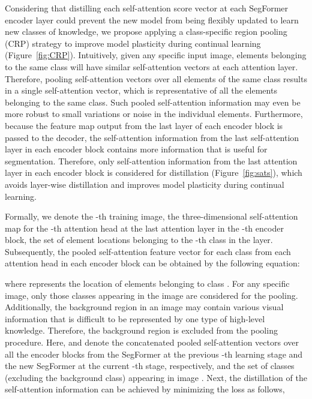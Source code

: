 \documentclass[onecolumn,conference,compsoc]{IEEEtran}
\begin{document}
\begin{spacing}{1.5}
Considering that {distilling} each self-attention score vector at each SegFormer encoder layer  {could prevent} the new model  {from} being flexibly updated to learn new classes of knowledge, we propose applying a class-specific region pooling (CRP) strategy to improve model plasticity during continual learning (Figure~\ref{fig:CRP}). Intuitively, given any specific input image, elements belonging to the same class will have similar self-attention vectors {at each attention layer}. Therefore, pooling self-attention vectors over all elements of the same class results in a single self-attention vector, which is representative  {of} all the elements belonging to the same class. Such pooled self-attention information may even be more robust to small variations or noise in the individual elements.  {Furthermore, because} the feature map output from the last layer of each encoder block is passed to the decoder, the self-attention information from the last self-attention layer in each encoder block contains more information that is useful for segmentation.  {Therefore,} only self-attention information from the last attention layer in each encoder block is considered for distillation (Figure~\ref{fig:sats}), which avoids layer-wise distillation and improves model plasticity during continual learning.

Formally,  we denote  the -th training image,  the three-dimensional self-attention map for the -th attention head at the last attention layer in the -th encoder block,  the set of element locations belonging to the -th class in the layer.  {Subsequently,} the pooled self-attention feature vector for each class from each attention head in each encoder block can be obtained by  {the following equation:}



\noindent where  represents the location of elements belonging to class . For any specific image, only those classes appearing in the image are considered for the pooling.  {Additionally,} the background region in an image may contain various visual information that is difficult to be represented by one type of  high-level knowledge. Therefore, the background region is excluded  {from} the pooling procedure.  {Here,}  and   {denote} the concatenated pooled self-attention vectors over all the encoder blocks from the SegFormer at the previous -th learning stage and the new SegFormer at the current -th stage, respectively, and  the set of classes (excluding the background class) appearing in image . Next, the distillation of the self-attention information can be achieved by minimizing the loss   {as follows,}




\end{spacing}
\end{document}
